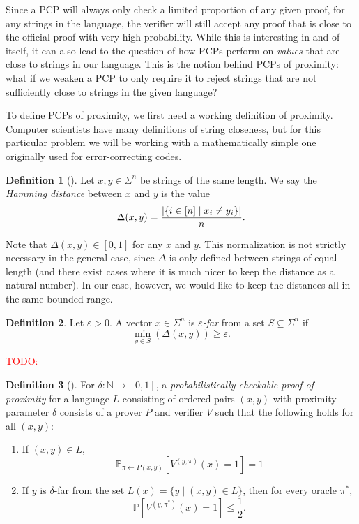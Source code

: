 \documentclass[english,12pt]{reedthesis}
\theoremstyle{plain}
\theoremstyle{definition}
\newtheorem{defn}[defn]{Definition}
\theoremstyle{remark}
\DeclarePairedDelimiter{\abs}{\lvert}{\rvert}
\newcommand{\TODO}[1]{\textcolor{red}{TODO: #1}}
\begin{document}
Since a PCP will always only check a limited proportion of any given proof, for
any strings in the language, the verifier will still accept any proof that is
close to the official proof with very high probability. While this is
interesting in and of itself, it can also lead to the question of how PCPs
perform on \emph{values} that are close to strings in our language. This is the
notion behind PCPs of proximity: what if we weaken a PCP to only require it to
reject strings that are not sufficiently close to strings in the given language?

To define PCPs of proximity, we first need a working definition of proximity.
Computer scientists have many definitions of string closeness, but for this
particular problem we will be working with a mathematically simple one
originally used for error-correcting codes.

\begin{defn}[{\cite{Ham50}}]\label{def:hamming-dist}
  Let $x, y \in \Sigma^{n}$ be strings of the same length. We say the \emph{Hamming
    distance} between $x$ and $y$ is the value
  \[
    \Delta(x, y) = \frac{\abs{\{i \in [n] \mid x_{i} \ne y_{i}\}}}{n}.
  \]
\end{defn}

Note that $\Delta(x, y) \in [0, 1]$ for any $x$ and $y$. This normalization is not
strictly necessary in the general case, since $\Delta$ is only defined between
strings of equal length (and there exist cases where it is much nicer to keep
the distance as a natural number). In our case, however, we would like to keep
the distances all in the same bounded range.

\begin{defn}\label{def:far}
  Let $\varepsilon > 0$. A vector $x \in \Sigma^{n}$ is \emph{$\varepsilon$-far} from a set $S \subseteq \Sigma^{n}$ if
  \[
    \min_{y \in S}(\Delta(x, y)) \ge \varepsilon.
  \]
\end{defn}

\TODO{}

\begin{defn}[{\cite[Def.\ 2.2]{GOS25}}]\label{def:pcpp}
  For $\delta\colon \mathbb{N} \rightarrow [0, 1]$, a \emph{probabilistically-checkable proof of
    proximity} for a language $L$ consisting of ordered pairs $(x, y)$ with
  proximity parameter $\delta$ consists of a prover $P$ and verifier $V$ such that
  the following holds for all $(x, y)$:
  \begin{enumerate}
    \item If $(x, y) \in L$,
          \[
            \mathbb{P}_{\pi \leftarrow P(x, y)}[V^{(y, \pi)}(x) = 1] = 1
          \]
    \item If $y$ is $\delta$-far from the set $L(x) = \{y \mid (x, y) \in L\}$, then for
          every oracle $\pi^{*}$,
          \[
            \mathbb{P}[V^{(y, \pi^{*})}(x) = 1] \le \frac{1}{2}.
          \]
  \end{enumerate}
\end{defn}
\end{document}
